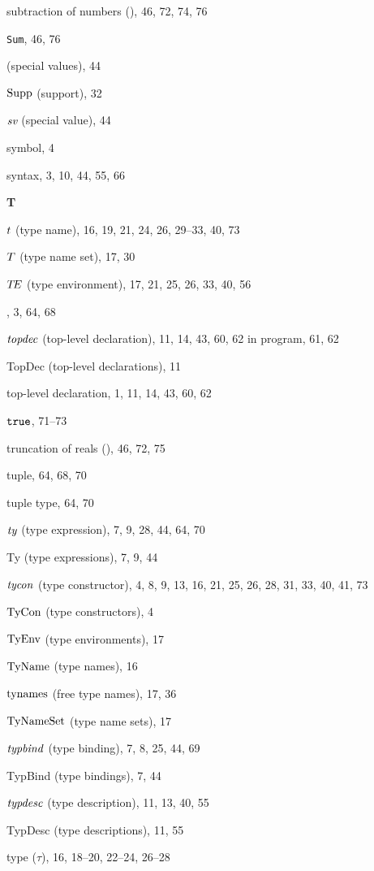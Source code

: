 \begin{theindex}
\item subtraction of numbers (\ml{-}), 46, 72, 74, 76
\item {\tt Sum}, 46, 76
\item {\SVal} (special values), 44
\item $\mathop{\rm Supp}\nolimits$ (support), 32
\item $\mbox{\it sv}$ (special value), 44
\item symbol, 4
\item syntax, 3, 10, 44, 55, 66
\indexspace
\parbox{65mm}{\hfil{\large\bf T}\hfil}
\indexspace
\item $t$ (type name), 16, 19, 21, 24, 26, 29--33, 40, 73
\item $T$ (type name set), 17, 30
\item $\mbox{$T\!E$}$ (type environment), 17, 21, 25, 26, 33, 40, 56
\item \THEN, 3, 64, 68
\item ${\it topdec}$ (top-level declaration), 11, 14, 43, 60, 62
\subitem in program, 61, 62
\item TopDec (top-level declarations), 11
\item top-level declaration, 1, 11, 14, 43, 60, 62
\item $\mbox{\tt true}$, 71--73
\item truncation of reals (), 46, 72, 75
\item tuple, 64, 68, 70
\item tuple type, 64, 70
\item ${\it ty}$ (type expression), 7, 9, 28, 44, 64, 70
\item Ty (type expressions), 7, 9, 44
\item ${\it tycon}$ (type constructor), 4, 8, 9, 13, 16, 21, 25, 26, 28, 31, 33, 40, 41, 73
\item ${\rm TyCon}$ (type constructors), 4
\item ${\rm TyEnv}$ (type environments), 17
\item ${\rm TyName}$ (type names), 16
\item $\mathop{\rm tynames}\nolimits$ (free type names), 17, 36
\item ${\rm TyNameSet}$ (type name sets), 17
\item ${\it typbind}$ (type binding), 7, 8, 25, 44, 69
\item TypBind (type bindings), 7, 44
\item ${\it typdesc}$ (type description), 11, 13, 40, 55
\item TypDesc (type descriptions), 11, 55
\item type ($\tau$), 16, 18--20, 22--24, 26--28

\end{theindex}
